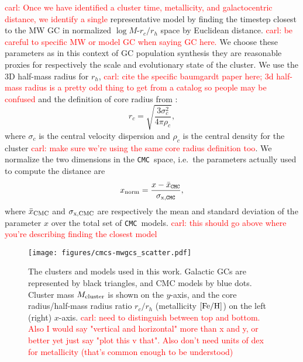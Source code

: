 \documentclass[twocolumn]{aastex631}
\newcommand{\CMC}{\texttt{CMC}}
\newcommand{\carl}[1]{\textcolor{red}{carl: #1}}
\begin{document}
\carl{Once we have identified a cluster time, metallicity, and galactocentric distance, we identify a single} representative model by finding the timestep closest to the MW GC in normalized $\log M$-$r_c / r_h$ space by Euclidean distance. \carl{be careful to specific MW or model GC when saying GC here.}
We choose these parameters as in this context of GC population synthesis they are reasonable proxies for respectively the scale and evolutionary state of the cluster.
We use the 3D half-mass radius for $r_h$, \carl{cite the specific baumgardt paper here; 3d half-mass radius is a pretty odd thing to get from a catalog so people may be confused} and the definition of core radius from \citet{1987degc.book.....S}:
\begin{equation}
    r_c = \sqrt{\frac{3 \sigma_c^2}{4 \pi \rho_c}},
\end{equation}
where $\sigma_c$ is the central velocity dispersion and $\rho_c$ is the central density for the cluster \carl{make sure we're using the same core radius definition too}.
We normalize the two dimensions in the \CMC\ space, i.e.~the parameters actually used to compute the distance are
\begin{equation}
    x_{\rm norm} = \frac{x - \bar{x}_{\rm \CMC}}{\sigma_{\rm x, \CMC}},
\end{equation}
where $\bar{x}_{\rm CMC}$ and $\sigma_{\rm x,CMC}$ are respectively the mean and standard deviation of the parameter $x$ over the total set of \CMC\ models. \carl{this should go above where you're describing finding the closest model}

\begin{figure}
    \begin{centering}
        \texttt{[image: figures/cmcs-mwgcs\_scatter.pdf]}
        \caption{
        The clusters and models used in this work.
        Galactic GCs are represented by black triangles, and CMC models by blue dots.
        Cluster mass $M_{\rm cluster}$ is shown on the $y$-axis, and the core radius/half-mass radius ratio $r_c/r_h$ (metallicity $[{\rm Fe/H}]$) on the left (right) $x$-axis. \carl{need to distinguish between top and bottom.  Also I would say "vertical and horizontal" more than x and y, or better yet just say "plot this v that".  Also don't need units of dex for metallicity (that's common enough to be understood)}
        }
        \label{fig:cmcs-mwgcs_scatter}
    \end{centering}
\end{figure}
\end{document}
